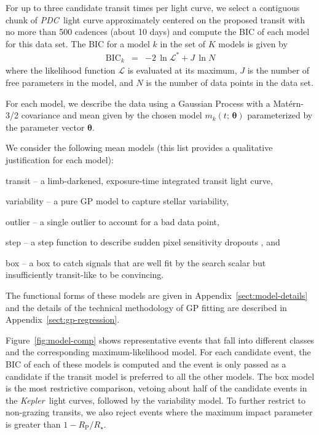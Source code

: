 \documentclass[manuscript, letterpaper]{aastex6}
\newcommand{\project}[1]{\textsl{#1}}
\newcommand{\kepler}{\project{Kepler}}
\newcommand{\pdc}{\project{PDC}}
\newcommand{\dfmfigref}[1]{\ref{fig:#1}}
\newcommand{\dfmFig}[1]{Figure~\dfmfigref{#1}}
\newcommand{\dfmfig}[1]{\dfmFig{#1}}
\newcommand{\sectref}[1]{\ref{sect:#1}}
\newcommand{\App}[1]{Appendix~\sectref{#1}}
\newcommand{\app}[1]{\App{#1}}
\newcommand{\bvec}[1]{{\ensuremath{\boldsymbol{#1}}}}
\newcommand{\meanpars}{{\ensuremath{\bvec{\theta}}}}
\newcommand{\modelname}[1]{{\textsf{#1}}}
\begin{document}
For up to three candidate transit times per light curve, we select a
contiguous chunk of \pdc\ light curve approximately centered on the proposed
transit with no more than 500 cadences (about 10 days) and compute the BIC of
each model for this data set.
The BIC for a model $k$ in the set of $K$ models is given by
\begin{eqnarray}
\mathrm{BIC}_k &=& -2\,\ln \mathcal{L}^* + J\,\ln N
\end{eqnarray}
where the likelihood function $\mathcal{L}$ is evaluated at its maximum, $J$
is the number of free parameters in the model, and $N$ is the number of
data points in the data set.

For each model, we describe the data using a Gaussian Process
\citep[GP;][]{Rasmussen:2006} with a Mat\'ern-3/2 covariance and mean given by
the chosen model $m_k(t;\,\meanpars)$ parameterized by the parameter vector
\meanpars.

We consider the following mean models (this list provides a qualitative
justification for each model):
\begin{itemize}
{\item \modelname{transit} -- a limb-darkened, exposure-time integrated
transit light curve,}
{\item \modelname{variability} -- a pure GP model to capture
stellar variability,}
{\item \modelname{outlier} -- a single outlier to account for a bad data
point,}
{\item \modelname{step} -- a step function to describe sudden pixel
sensitivity dropouts \citep[SPSDs; for example][]{Christiansen:2013}, and}
{\item \modelname{box} -- a box to catch signals that are well fit by the
search scalar but insufficiently transit-like to be convincing.}
\end{itemize}
The functional forms of these models are given in \app{model-details} and the
details of the technical methodology of GP fitting are described in
\app{gp-regression}.

\dfmfig{model-comp} shows representative events that fall into different
classes and the corresponding maximum-likelihood model.
For each candidate event, the BIC of each of these models is computed and the
event is only passed as a candidate if the \modelname{transit} model is
preferred to all the other models.
The \modelname{box} model is the most restrictive comparison, vetoing about
half of the candidate events in the \kepler\ light curves, followed by the
\modelname{variability} model.
To further restrict to non-grazing transits, we also reject events where the
maximum impact parameter is greater than $1 - R_\mathrm{P} / R_\star$.
\end{document}
